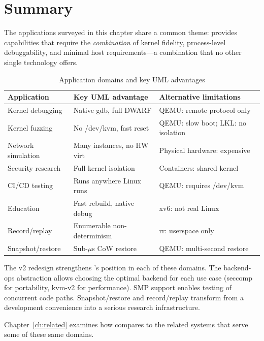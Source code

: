 \section{Summary}
\label{sec:app-summary}

The applications surveyed in this chapter share a common theme:
\UML{} provides capabilities that require the \emph{combination} of
kernel fidelity, process-level debuggability, and minimal host
requirements---a combination that no other single technology offers.

\begin{table}[ht]
\centering
\caption{Application domains and key UML advantages}
\label{tab:app-summary}
\begin{tabularx}{\textwidth}{l Y Y}
\toprule
\textbf{Application} & \textbf{Key UML advantage} & \textbf{Alternative limitations} \\
\midrule
Kernel debugging   & Native gdb, full DWARF        & QEMU: remote protocol only \\
Kernel fuzzing     & No /dev/kvm, fast reset        & QEMU: slow boot; LKL: no isolation \\
Network simulation & Many instances, no HW virt     & Physical hardware: expensive \\
Security research  & Full kernel isolation           & Containers: shared kernel \\
CI/CD testing      & Runs anywhere Linux runs        & QEMU: requires /dev/kvm \\
Education          & Fast rebuild, native debug      & xv6: not real Linux \\
Record/replay      & Enumerable non-determinism      & rr: userspace only \\
Snapshot/restore   & Sub-$\mu$s CoW restore          & QEMU: multi-second restore \\
\bottomrule
\end{tabularx}
\end{table}

The v2 redesign strengthens \UML{}'s position in each of these domains.
The backend-ops abstraction allows choosing the optimal backend for each
use case (seccomp for portability, kvm-v2 for performance).  SMP support
enables testing of concurrent code paths.  Snapshot/restore and
record/replay transform \UML{} from a development convenience into a
serious research infrastructure.

Chapter~\ref{ch:related} examines how \UML{} compares to the related
systems that serve some of these same domains.
